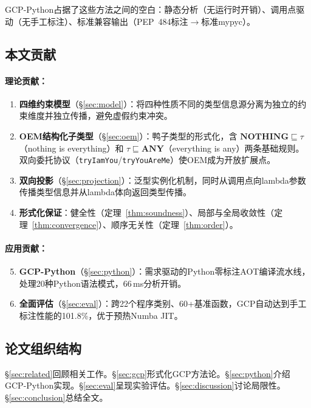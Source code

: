 \documentclass[UTF8]{article}
\newcommand{\NOTHING}{\mathbf{NOTHING}}
\newcommand{\ANY}{\mathbf{ANY}}
\begin{document}
GCP-Python占据了这些方法之间的空白：静态分析（无运行时开销）、调用点驱动（无手工标注）、标准兼容输出（PEP~484标注$\to$标准mypyc）。

\subsection{本文贡献}

\paragraph{理论贡献：}
\begin{enumerate}[leftmargin=2em]
\item \textbf{四维约束模型}（\S\ref{sec:model}）：将四种性质不同的类型信息源分离为独立的约束维度并独立传播，避免虚假约束冲突。
\item \textbf{OEM结构化子类型}（\S\ref{sec:oem}）：鸭子类型的形式化，含 $\NOTHING \sqsubseteq \tau$（nothing is everything）和 $\tau \sqsubseteq \ANY$（everything is any）两条基础规则。双向委托协议（\texttt{tryIamYou}/\texttt{tryYouAreMe}）使OEM成为开放扩展点。
\item \textbf{双向投影}（\S\ref{sec:projection}）：泛型实例化机制，同时从调用点向lambda参数传播类型信息并从lambda体向返回类型传播。
\item \textbf{形式化保证}：健全性（定理~\ref{thm:soundness}）、局部与全局收敛性（定理~\ref{thm:convergence}）、顺序无关性（定理~\ref{thm:order}）。
\end{enumerate}

\paragraph{应用贡献：}
\begin{enumerate}[leftmargin=2em]
\setcounter{enumi}{4}
\item \textbf{GCP-Python}（\S\ref{sec:python}）：需求驱动的Python零标注AOT编译流水线，处理20种Python语法模式，66\,ms分析开销。
\item \textbf{全面评估}（\S\ref{sec:eval}）：跨22个程序类别、60+基准函数，GCP自动达到手工标注性能的101.8\%，优于预热Numba JIT。
\end{enumerate}

\subsection{论文组织结构}

\S\ref{sec:related}回顾相关工作。\S\ref{sec:gcp}形式化GCP方法论。\S\ref{sec:python}介绍GCP-Python实现。\S\ref{sec:eval}呈现实验评估。\S\ref{sec:discussion}讨论局限性。\S\ref{sec:conclusion}总结全文。
\end{document}
